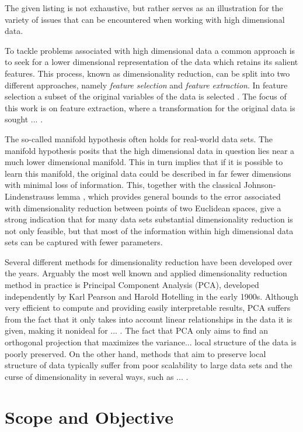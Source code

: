 The given listing is not exhaustive, but rather serves as an illustration for the variety of issues that can be encountered when working with high dimensional data.

To tackle problems associated with high dimensional data a common approach is to seek for a lower dimensional representation of the data which retains its salient features. This process, known as dimensionality reduction, can be split into two different approaches, namely \textit{feature selection} and \textit{feature extraction}. In feature selection a subset of the original variables of the data is selected . The focus of this work is on feature extraction, where a transformation for the original data is sought ... .

The so-called manifold hypothesis \cite{manifold_hypothesis} often holds for real-world data sets. The manifold hypothesis posits that the high dimensional data in question lies near a much lower dimensional manifold. This in turn implies that if it is possible to learn this manifold, the original data could be described in far fewer dimensions with minimal loss of information. This, together with the classical Johnson-Lindenstrauss lemma \cite{johnson_lindenstrauss}, which provides general bounds to the error associated with dimensionality reduction between points of two Euclidean spaces, give a strong indication that for many data sets substantial dimensionality reduction is not only feasible, but that most of the information within high dimensional data sets can be captured with fewer parameters.

Several different methods for dimensionality reduction have been developed over the years. Arguably the most well known and applied dimensionality reduction method in practice is Principal Component Analysis (PCA), developed independently by Karl Pearson \cite{pca_1} and Harold Hotelling \cite{pca_2} in the early 1900s. Although very efficient to compute and providing easily interpretable results, PCA suffers from the fact that it only takes into account linear relationships in the data it is given, making it nonideal for ... . The fact that PCA only aims to find an orthogonal projection that maximizes the variance... local structure of the data is poorly preserved. On the other hand, methods that aim to preserve local structure of data typically suffer from poor scalability to large data sets and the curse of dimensionality in several ways, such as ... .

\section{Scope and Objective}

